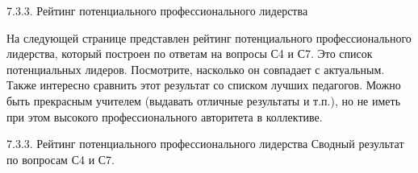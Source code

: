 \begin{frame}{7.3.3. Рейтинг потенциального профессионального лидерства}
\tiny 

На следующей странице представлен рейтинг потенциального профессионального лидерства, который построен по 
ответам на вопросы С4 и С7.
Это список потенциальных лидеров. 
Посмотрите, насколько он совпадает с актуальным. Также интересно сравнить этот результат со списком лучших педагогов. 
Можно быть прекрасным учителем (выдавать отличные результаты и т.п.), но не иметь при этом высокого профессионального 
авторитета в коллективе.
\end{frame}

\begin{frame}{7.3.3. Рейтинг потенциального профессионального лидерства}
\tiny 
Сводный результат по вопросам С4 и С7.

\fontsize{5pt}{5}\selectfont
\begin{center}
\begin{tabular}{cp{5cm}p{3cm}c}

\end{tabular}
\end{center}
\end{frame}



